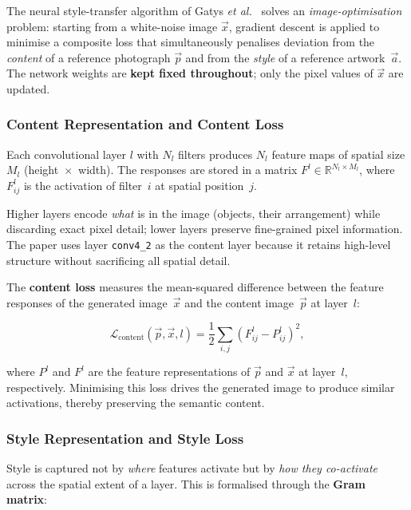 \documentclass{article}
\begin{document}
The neural style-transfer algorithm of Gatys \textit{et al.}~\cite{gatys2015neural}
solves an \emph{image-optimisation} problem: starting from a white-noise image
$\vec{x}$, gradient descent is applied to minimise a composite loss that
simultaneously penalises deviation from the \emph{content} of a reference
photograph $\vec{p}$ and from the \emph{style} of a reference artwork~$\vec{a}$.
The network weights are \textbf{kept fixed throughout}; only the pixel values of
$\vec{x}$ are updated.

\subsubsection{Content Representation and Content Loss}

Each convolutional layer $l$ with $N_l$ filters produces $N_l$ feature maps of
spatial size $M_l$ (height~$\times$~width). The responses are stored in a
matrix $F^l \in \mathbb{R}^{N_l \times M_l}$, where $F^l_{ij}$ is the
activation of filter~$i$ at spatial position~$j$.

Higher layers encode \emph{what} is in the image (objects, their arrangement)
while discarding exact pixel detail; lower layers preserve fine-grained pixel
information. The paper uses layer \texttt{conv4\_2} as the content layer
because it retains high-level structure without sacrificing all spatial detail.

The \textbf{content loss} measures the mean-squared difference between the
feature responses of the generated image~$\vec{x}$ and the content
image~$\vec{p}$ at layer~$l$:

\begin{equation}
    \mathcal{L}_{\text{content}}(\vec{p},\vec{x},l)
    = \frac{1}{2}\sum_{i,j}\!\left(F^l_{ij} - P^l_{ij}\right)^2,
    \label{eq:content_loss}
\end{equation}

\noindent where $P^l$ and $F^l$ are the feature representations of $\vec{p}$
and $\vec{x}$ at layer~$l$, respectively. Minimising this loss drives the
generated image to produce similar activations, thereby preserving the semantic
content.

\subsubsection{Style Representation and Style Loss}

Style is captured not by \emph{where} features activate but by \emph{how they
co-activate} across the spatial extent of a layer. This is formalised through
the \textbf{Gram matrix}:
\end{document}
